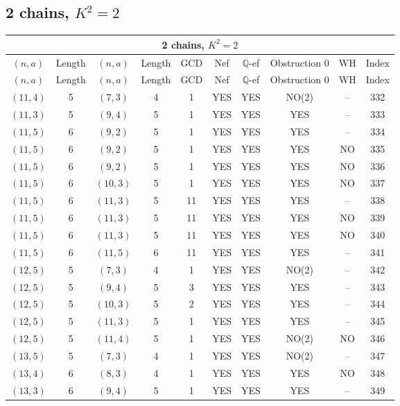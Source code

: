 \subsection{2 chains, $K^2 = 2$}
\begin{longtable}{|c|c|c|c|c|c|c|c|c|c|}
\hline
\multicolumn{10}{|c|}{2 chains, $K^2 = 2$}\\
\hline
$(n,a)$ & Length & $(n,a)$ & Length & GCD & Nef & $\mathbb Q$-ef & Obstruction 0 & WH & Index\\
\hline
\endfirsthead

\hline
$(n,a)$ & Length & $(n,a)$ & Length & GCD & Nef & $\mathbb Q$-ef & Obstruction 0 & WH & Index\\
\hline
\endhead
\hline
\endfoot

$(11, 4)$ & 5 & $(7, 3)$ & 4 & 1 & YES & YES & NO(2) & -- & 332\\
$(11, 3)$ & 5 & $(9, 4)$ & 5 & 1 & YES & YES & YES & -- & 333\\
$(11, 5)$ & 6 & $(9, 2)$ & 5 & 1 & YES & YES & YES & -- & 334\\
$(11, 5)$ & 6 & $(9, 2)$ & 5 & 1 & YES & YES & YES & NO & 335\\
$(11, 5)$ & 6 & $(9, 2)$ & 5 & 1 & YES & YES & YES & NO & 336\\
$(11, 5)$ & 6 & $(10, 3)$ & 5 & 1 & YES & YES & YES & NO & 337\\
$(11, 5)$ & 6 & $(11, 3)$ & 5 & 11 & YES & YES & YES & -- & 338\\
$(11, 5)$ & 6 & $(11, 3)$ & 5 & 11 & YES & YES & YES & NO & 339\\
$(11, 5)$ & 6 & $(11, 3)$ & 5 & 11 & YES & YES & YES & NO & 340\\
$(11, 5)$ & 6 & $(11, 5)$ & 6 & 11 & YES & YES & YES & -- & 341\\
$(12, 5)$ & 5 & $(7, 3)$ & 4 & 1 & YES & YES & NO(2) & -- & 342\\
$(12, 5)$ & 5 & $(9, 4)$ & 5 & 3 & YES & YES & YES & -- & 343\\
$(12, 5)$ & 5 & $(10, 3)$ & 5 & 2 & YES & YES & YES & -- & 344\\
$(12, 5)$ & 5 & $(11, 3)$ & 5 & 1 & YES & YES & YES & -- & 345\\
$(12, 5)$ & 5 & $(11, 4)$ & 5 & 1 & YES & YES & NO(2) & NO & 346\\
$(13, 5)$ & 5 & $(7, 3)$ & 4 & 1 & YES & YES & NO(2) & -- & 347\\
$(13, 4)$ & 6 & $(8, 3)$ & 4 & 1 & YES & YES & YES & NO & 348\\
$(13, 3)$ & 6 & $(9, 4)$ & 5 & 1 & YES & YES & YES & -- & 349\\

\end{longtable}
